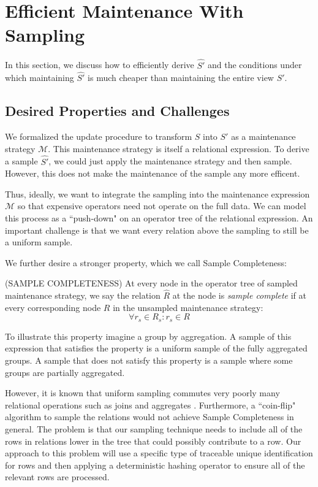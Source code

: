 \section{Efficient Maintenance With Sampling}
In this section, we discuss how to efficiently derive $\hat{S'}$ and the conditions under which
maintaining $\hat{S'}$ is much cheaper than maintaining the entire view $S'$.

\subsection{Desired Properties and Challenges}
We formalized the update procedure to transform $S$ into $S'$ as a maintenance strategy $\mathcal{M}$.
This maintenance strategy is itself a relational expression.
To derive a sample $\hat{S'}$, we could just apply the maintenance strategy and then sample.
However, this does not make the maintenance of the sample any more efficent.

Thus, ideally, we want to integrate the sampling into the maintenance expression $\mathcal{M}$ so that expensive operators
need not operate on the full data.
We can model this process as a ``push-down"\cite{??} on an operator tree of the relational expression.
An important challenge is that we want every relation above the sampling to still be a uniform sample.

We further desire a stronger property, which we call Sample Completeness:
\begin{definition} (SAMPLE COMPLETENESS) At every node in the operator tree of sampled maintenance strategy, we say the relation $\hat{R}$ at the node is \emph{sample complete} if at every corresponding node $R$ in the unsampled maintenance strategy:
\[ \forall r_s \in R_s : r_s \in R \]
\end{definition}
To illustrate this property imagine a group by aggregation.
A sample of this expression that satisfies the property is a uniform sample of the fully aggregated groups.
A sample that does not satisfy this property is a sample where some groups are partially aggregated.

However, it is known that uniform sampling commutes very poorly many relational operations such as joins and aggregates \cite{??}.
Furthermore, a ``coin-flip" algorithm to sample the relations would not achieve Sample Completeness in general.
The problem is that our sampling technique needs to include all of the rows in relations lower in the tree that could possibly contribute to a row.
Our approach to this problem will use a specific type of traceable unique identification for rows and then applying a deterministic hashing operator to ensure all of the relevant rows are processed.

